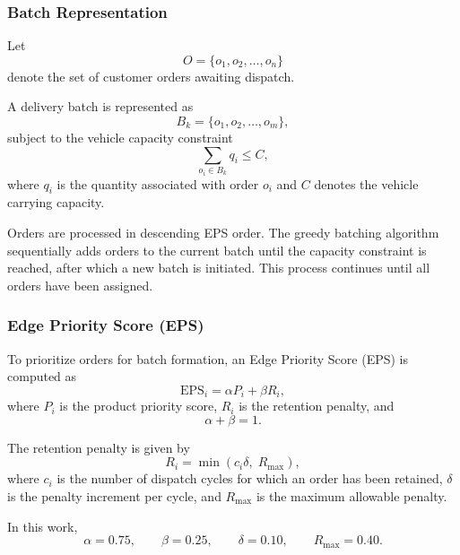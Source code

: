 \documentclass{article}
\begin{document}
\subsubsection{Batch Representation}
\label{subsubsec:batch_representation}

Let
\begin{equation}
O = \{o_1, o_2, \ldots, o_n\}
\end{equation}
denote the set of customer orders awaiting dispatch.

A delivery batch is represented as
\begin{equation}
B_k = \{o_1, o_2, \ldots, o_m\},
\end{equation}
subject to the vehicle capacity constraint
\begin{equation}
\sum_{o_i \in B_k} q_i \le C,
\end{equation}
where $q_i$ is the quantity associated with order $o_i$ and $C$ denotes the vehicle carrying capacity.

Orders are processed in descending EPS order. The greedy batching algorithm sequentially adds orders to the current batch until the capacity constraint is reached, after which a new batch is initiated. This process continues until all orders have been assigned.

\subsubsection{Edge Priority Score (EPS)}
\label{subsubsec:edge_priority_score}

To prioritize orders for batch formation, an Edge Priority Score (EPS) is computed as
\begin{equation}
\mathrm{EPS}_i = \alpha P_i + \beta R_i,
\end{equation}
where $P_i$ is the product priority score, $R_i$ is the retention penalty, and
\begin{equation}
\alpha + \beta = 1.
\end{equation}

The retention penalty is given by
\begin{equation}
R_i = \min(c_i\delta,\; R_{\max}),
\end{equation}
where $c_i$ is the number of dispatch cycles for which an order has been retained, $\delta$ is the penalty increment per cycle, and $R_{\max}$ is the maximum allowable penalty.

In this work,
\begin{equation}
\alpha = 0.75, \qquad \beta = 0.25, \qquad \delta = 0.10, \qquad R_{\max} = 0.40.
\end{equation}
\end{document}
